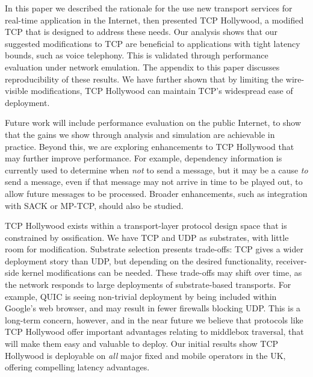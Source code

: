 
In this paper we described the rationale for the use new transport services
for real-time application in the Internet, then presented TCP Hollywood, a 
modified TCP that is designed to address these needs.
Our analysis shows that our suggested modifications to TCP are beneficial
to applications with tight latency bounds, such as voice telephony. This
is validated through performance evaluation under network emulation. The
appendix to this paper discusses reproducibility of these results.
We have further shown that by limiting the wire-visible modifications, 
TCP Hollywood can maintain TCP's widespread ease of deployment.

Future work will include performance evaluation on the public Internet, to 
show that the gains we show through analysis and simulation are achievable
in practice. 
Beyond this, we are exploring enhancements to TCP Hollywood that may
further improve performance. For example, dependency information is
currently used to determine when \textit{not} to send a message, but it may
be a cause \textit{to} send a message, even if that message may not arrive
in time to be played out, to allow future messages to be processed. Broader
enhancements, such as integration with SACK or MP-TCP, should also be
studied.

TCP Hollywood exists within a transport-layer protocol design space that
is constrained by ossification. We have TCP and UDP as substrates, with
little room for modification. Substrate selection presents trade-offs:
TCP gives a wider deployment story than UDP, but depending on the desired
functionality, receiver-side kernel modifications can be needed.
These trade-offs may shift over time, as the network responds to large
deployments of substrate-based transports. For example, QUIC is seeing
non-trivial deployment by being included within Google's web browser, and
may result in fewer firewalls blocking UDP. This is a long-term concern,
however, and in the near future we believe that protocols like TCP
Hollywood offer important advantages relating to middlebox traversal,
that will make them easy and valuable to deploy. Our initial results
show TCP Hollywood is deployable on \emph{all} major fixed and mobile
operators in the UK, offering compelling latency advantages.

